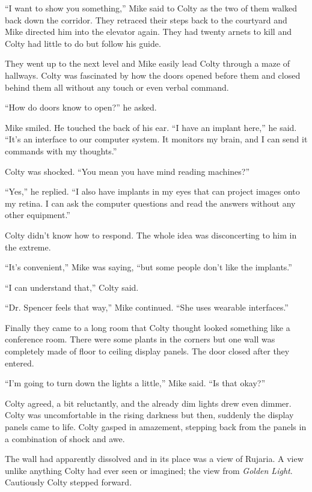 \breakpoint

``I want to show you something,'' Mike said to Colty as the two of them walked back down the
corridor. They retraced their steps back to the courtyard and Mike directed him into the
elevator again. They had twenty arnets to kill and Colty had little to do but follow his guide.

They went up to the next level and Mike easily lead Colty through a maze of hallways. Colty
was fascinated by how the doors opened before them and closed behind them all without any touch
or even verbal command.

``How do doors know to open?'' he asked.

Mike smiled. He touched the back of his ear. ``I have an implant here,'' he said. ``It's an
interface to our computer system. It monitors my brain, and I can send it commands with my
thoughts.''

Colty was shocked. ``You mean you have mind reading machines?''

``Yes,'' he replied. ``I also have implants in my eyes that can project images onto my retina. I
can ask the computer questions and read the answers without any other equipment.''

Colty didn't know how to respond. The whole idea was disconcerting to him in the extreme.

``It's convenient,'' Mike was saying, ``but some people don't like the implants.''

``I can understand that,'' Colty said.

``Dr. Spencer feels that way,'' Mike continued. ``She uses wearable interfaces.''

Finally they came to a long room that Colty thought looked something like a conference room.
There were some plants in the corners but one wall was completely made of floor to ceiling
display panels. The door closed after they entered.

``I'm going to turn down the lights a little,'' Mike said. ``Is that okay?''

Colty agreed, a bit reluctantly, and the already dim lights drew even dimmer. Colty was
uncomfortable in the rising darkness but then, suddenly the display panels came to life. Colty
gasped in amazement, stepping back from the panels in a combination of shock and awe.

The wall had apparently dissolved and in its place was a view of Rujaria. A view unlike anything
Colty had ever seen or imagined; the view from \textit{Golden Light}. Cautiously Colty stepped
forward.

